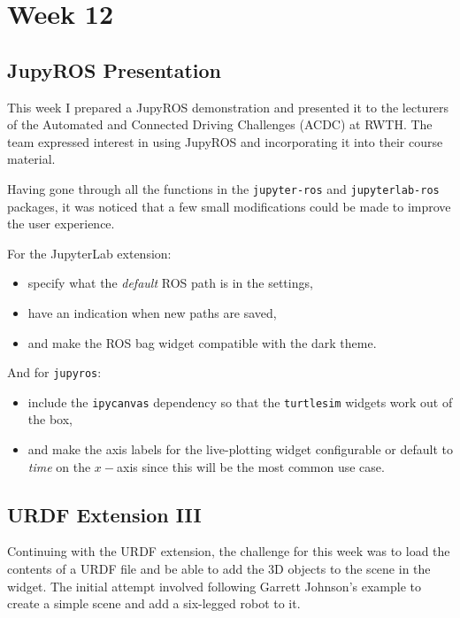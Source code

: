 \chapter{Week 12}

    \section{JupyROS Presentation}

    This week I prepared a JupyROS demonstration and presented it to the lecturers of the Automated and Connected Driving Challenges (ACDC) at RWTH. The team expressed interest in using JupyROS and incorporating it into their course material.

    Having gone through all the functions in the \texttt{jupyter-ros} and \texttt{jupyterlab-ros} packages, it was noticed that a few small modifications could be made to improve the user experience.

    For the JupyterLab extension:
    \begin{itemize}
        \item specify what the \textit{default} ROS path is in the settings,
        \item have an indication when new paths are saved,
        \item and make the ROS bag widget compatible with the dark theme.
    \end{itemize}

    And for \texttt{jupyros}:
    \begin{itemize}
        \item include the \texttt{ipycanvas} dependency so that the \texttt{turtlesim} widgets work out of the box,
        \item and make the axis labels for the live-plotting widget configurable or default to \textit{time} on the $x-$axis since this will be the most common use case.
    \end{itemize}

    \section{URDF Extension III}

    Continuing with the URDF extension, the challenge for this week was to load the contents of a URDF file and be able to add the 3D objects to the scene in the widget. The initial attempt involved following Garrett Johnson's example to create a simple scene and add a six-legged robot to it. 

